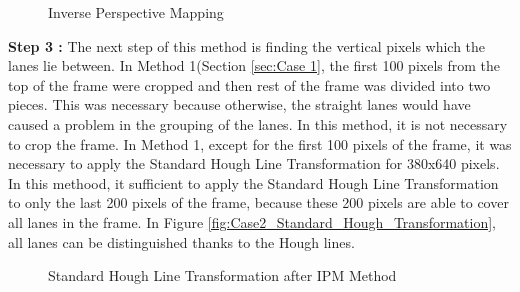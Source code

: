  
\begin{figure}[H]
  \centering
  \hfill
  \caption{Inverse Perspective Mapping}
\end{figure} 


\textbf{Step 3 : }The next step of this method is finding the vertical pixels which the lanes lie between. In Method 1(Section \ref{sec:Case 1}, the first 100 pixels from the top of the frame were cropped and then rest of the frame was divided into two pieces. This was necessary because otherwise, the straight lanes would have caused a problem in the grouping of the lanes. In this method, it is not necessary to crop the frame. In Method 1, except for the first 100 pixels of the frame, it was necessary to apply the Standard Hough Line Transformation for 380x640 pixels. In this methood, it sufficient to apply the Standard Hough Line Transformation to only the last 200 pixels of the frame, because these 200 pixels are able to cover all lanes in the frame. In Figure \ref{fig:Case2_Standard_Hough_Transformation}, all lanes can be distinguished thanks to the Hough lines. 


\begin{figure}[H]
  \centering
  \caption{Standard Hough Line Transformation after IPM Method}
\end{figure} 



